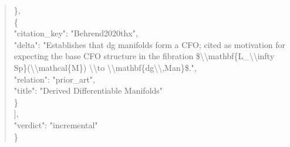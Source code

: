 \documentclass[11pt]{article}
\begin{document}
\begin{quote}
    \},\\
    \{\\
      "citation\_key": "Behrend2020thx",\\
      "delta": "Establishes that dg manifolds form a CFO; cited as motivation for expecting the base CFO structure in the fibration \$\textbackslash{}\textbackslash{}mathbf\{L\_\textbackslash{}\textbackslash{}infty Sp\}(\textbackslash{}\textbackslash{}mathcal\{M\}) \textbackslash{}\textbackslash{}to \textbackslash{}\textbackslash{}mathbf\{dg\textbackslash{}\textbackslash{},Man\}\$.",\\
      "relation": "prior\_art",\\
      "title": "Derived Differentiable Manifolds"\\
    \}\\
  ],\\
  "verdict": "incremental"\\
\}\\
\end{quote}
\end{document}

